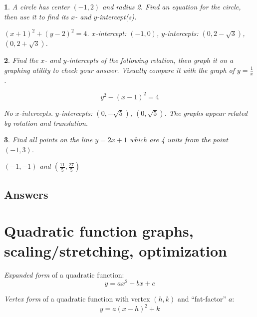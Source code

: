 \documentclass{amsbook}
\newtheorem{exc}{}
\newenvironment{ex}{\begin{exc}\normalfont}{\end{exc}}
\numberwithin{section}{chapter}
\numberwithin{equation}{chapter}
\begin{document}
\begin{ex}
	A circle has center $(-1,2)$ and radius 2. Find an equation for the circle, then use it to find its $x$- and $y$-intercept(s).
	\begin{sol}
		$(x+1)^2 + (y-2)^2 = 4$. $x$-intercept: $(-1,0)$, $y$-intercepts: $\left(0, 2-\sqrt{3}\right)$, $\left(0, 2+\sqrt{3}\right)$.
	\end{sol}
\end{ex}
\begin{ex}
	Find the  $x$- and $y$-intercepts of the following relation, then graph it on a graphing utility to check your answer. Visually compare it with the graph of $y=\frac{1}{x}$.
	
	 $$y^2-(x-1)^2 = 4 $$
	\begin{sol}
		No $x$-intercepts. $y$-intercepts: $\left(0, -\sqrt{5}\right)$, $\left(0, \sqrt{5}\right)$. The graphs appear related by rotation and translation.
	\end{sol}
\end{ex}

\begin{ex}
	Find all points on the line $y=2x+1$ which are 4 units from the point $(-1,3)$.
	\begin{sol}
		$(-1,-1)$ and $\left( \frac{11}{5}, \frac{27}{5} \right)$
	\end{sol}
\end{ex}


\subsection*{Answers \nopunct} \hfill
\begin{multicols}{2}
	
\end{multicols}

\newpage
\section{Quadratic function graphs, scaling/stretching, optimization} \label{quadraticgraphs}
 
\textit{Expanded form} of a quadratic function: $$y = ax^2+bx+c$$

\textit{Vertex form} of a quadratic function with vertex $(h,k)$ and ``fat-factor'' $a$: $$y = a(x-h)^2+k$$
\end{document}
